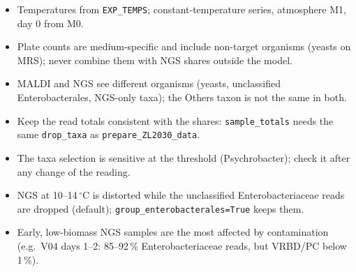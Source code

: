 \documentclass[11pt,a4paper]{article}
\newcommand{\code}[1]{\texttt{#1}}
\begin{document}
\begin{itemize}
\item Temperatures from \code{EXP\_TEMPS}; constant-temperature series, atmosphere M1, day 0 from M0.
\item Plate counts are medium-specific and include non-target organisms (yeasts on MRS); never combine them with NGS shares outside the model.
\item MALDI and NGS see different organisms (yeasts, unclassified Enterobacterales, NGS-only taxa); the Others taxon is not the same in both.
\item Keep the read totals consistent with the shares: \code{sample\_totals} needs the same \code{drop\_taxa} as \code{prepare\_ZL2030\_data}.
\item The taxa selection is sensitive at the threshold (Psychrobacter); check it after any change of the reading.
\item NGS at 10--14\,$^\circ$C is distorted while the unclassified Enterobacteriaceae reads are dropped (default); \code{group\_enterobacterales=True} keeps them.
\item Early, low-biomass NGS samples are the most affected by contamination (e.g.\ V04 days 1--2: 85--92\,\% Enterobacteriaceae reads, but VRBD/PC below 1\,\%).
\end{itemize}

\printbibliography
\end{document}
